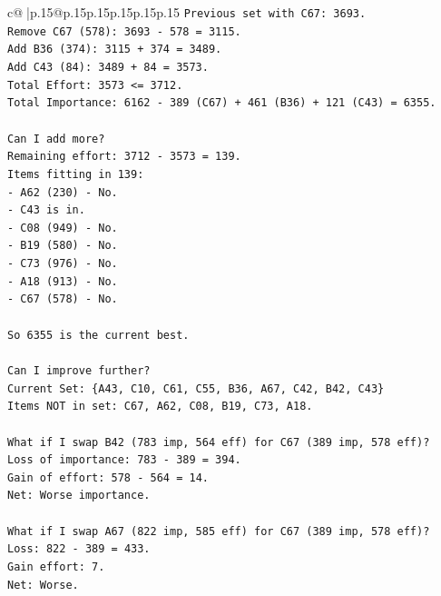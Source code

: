 \documentclass{article}
\begin{document}
{\begin{supertabular}{c@{$\;$}|p{.15\linewidth}@{}p{.15\linewidth}p{.15\linewidth}p{.15\linewidth}p{.15\linewidth}p{.15\linewidth}}
{{{\texttt{Previous set with C67: 3693.} \\
\texttt{Remove C67 (578): 3693 {-} 578 = 3115.} \\
\texttt{Add B36 (374): 3115 + 374 = 3489.} \\
\texttt{Add C43 (84): 3489 + 84 = 3573.} \\
\texttt{Total Effort: 3573 <= 3712.} \\
\texttt{Total Importance: 6162 {-} 389 (C67) + 461 (B36) + 121 (C43) = 6355.} \\
\\ 
\texttt{Can I add more?} \\
\texttt{Remaining effort: 3712 {-} 3573 = 139.} \\
\texttt{Items fitting in 139:} \\
\texttt{{-} A62 (230) {-} No.} \\
\texttt{{-} C43 is in.} \\
\texttt{{-} C08 (949) {-} No.} \\
\texttt{{-} B19 (580) {-} No.} \\
\texttt{{-} C73 (976) {-} No.} \\
\texttt{{-} A18 (913) {-} No.} \\
\texttt{{-} C67 (578) {-} No.} \\
\\ 
\texttt{So 6355 is the current best.} \\
\\ 
\texttt{Can I improve further?} \\
\texttt{Current Set: \{A43, C10, C61, C55, B36, A67, C42, B42, C43\}} \\
\texttt{Items NOT in set: C67, A62, C08, B19, C73, A18.} \\
\\ 
\texttt{What if I swap B42 (783 imp, 564 eff) for C67 (389 imp, 578 eff)?} \\
\texttt{Loss of importance: 783 {-} 389 = 394.} \\
\texttt{Gain of effort: 578 {-} 564 = 14.} \\
\texttt{Net: Worse importance.} \\
\\ 
\texttt{What if I swap A67 (822 imp, 585 eff) for C67 (389 imp, 578 eff)?} \\
\texttt{Loss: 822 {-} 389 = 433.} \\
\texttt{Gain effort: 7.} \\
\texttt{Net: Worse.} \\
\\ 
}}}
\end{supertabular}}
\end{document}
